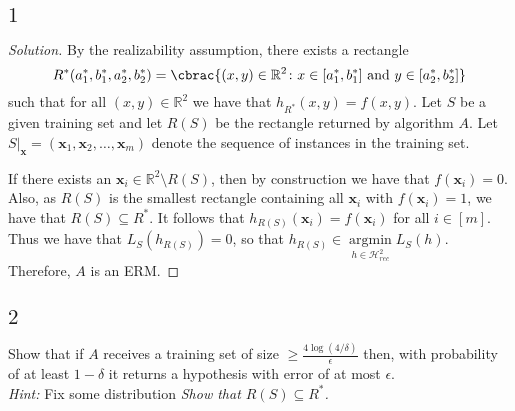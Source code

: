 \documentclass[10pt, a4paper, twoside]{amsart}
\newcommand{\R}{\ensuremath{\mathbb{R}}}
\DeclarePairedDelimiter\cbrac\{\}
\renewcommand{\c}{\ensuremath{\colon}}
\newcommand{\se}{\ensuremath{\subseteq}}
\newcommand{\argmin}{\operatorname*{argmin}}
\newenvironment{solution}
               {\let\oldqedsymbol=\qedsymbol
                \renewcommand{\qedsymbol}{$\blacktriangleleft$}
                \begin{proof}[Solution]}
               {\end{proof}
                \renewcommand{\qedsymbol}{\oldqedsymbol}}
\begin{document}
\subsection*{$1$}
\begin{solution}
By the realizability assumption, there exists a rectangle 
\begin{equation*}
R^*(a_1^*,b_1^*,a_2^*,b_2^*)=\cbrac{(x,y)\in \R^2 \c x \in [a_1^*,b_1^*] \text{ and }y \in [a_2^*, b_2^*]}
\end{equation*}
such that for all $(x, y) \in \R^2$ we have that
$h_{R^*}(x, y)=f(x, y)$. Let $S$ be a given training set and let $R(S)$ be the rectangle returned by algorithm $A$. 
Let $S|_{\mathbf{x}}=(\mathbf{x}_1, \mathbf{x}_2, \ldots, \mathbf{x}_m)$ denote the sequence of instances in the training set.

If there exists an $\mathbf{x}_i \in \R^2 \setminus R(S)$, then by construction we have that $f(\mathbf{x}_i)=0$.
Also, as $R(S)$ is the smallest rectangle containing all $\mathbf{x}_i$ with $f(\mathbf{x}_i)=1$,
we have that $R(S)\se R^*$. It follows that $h_{R(S)}(\mathbf{x}_i)=f(\mathbf{x}_i)$ for all $i \in [m]$.
Thus we have that $L_S(h_{R(S)})=0$, so that $h_{R(S)} \in \argmin\limits_{h \in \mathcal{H}^2_{rec}}L_S(h)$.
Therefore, $A$ is an ERM.
\end{solution}

\subsection*{$2$}
Show that if $A$ receives a training set of size $\geq \frac{4 \log (4/\delta)}{\epsilon}$ then, with probability of at least $1-\delta$ it returns a hypothesis with error  of at most $\epsilon$.\\
\textit{Hint:} Fix some distribution
\textit{Show that $R(S)\subseteq R^*$.}\\
\end{document}
